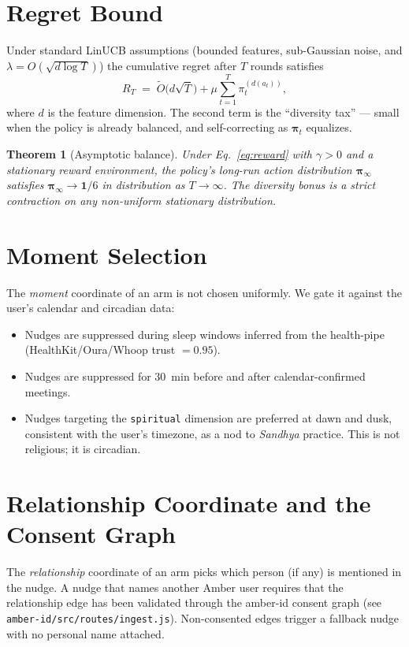 \documentclass[11pt]{article}
\newtheorem{theorem}{Theorem}
\begin{document}
\section{Regret Bound}

Under standard LinUCB assumptions (bounded features, sub-Gaussian
noise, and $\lambda = O(\sqrt{d\log T})$) the cumulative regret after
$T$ rounds satisfies
\[
R_T \;=\; \tilde O\!\bigl(d\sqrt{T}\bigr) + \mu \sum_{t=1}^{T} \pi_t^{(d(a_t))},
\]
where $d$ is the feature dimension. The second term is the
``diversity tax'' --- small when the policy is already balanced, and
self-correcting as $\bm{\pi}_t$ equalizes.

\begin{theorem}[Asymptotic balance]
Under Eq.~\ref{eq:reward} with $\gamma > 0$ and a stationary reward
environment, the policy's long-run action distribution $\bm{\pi}_\infty$
satisfies $\bm{\pi}_\infty \to \bm{1}/6$ in distribution as
$T \to \infty$. The diversity bonus is a strict contraction on any
non-uniform stationary distribution.
\end{theorem}

\section{Moment Selection}

The \emph{moment} coordinate of an arm is not chosen uniformly. We
gate it against the user's calendar and circadian data:
\begin{itemize}
\item Nudges are suppressed during sleep windows inferred from the
      health-pipe (HealthKit/Oura/Whoop trust $=0.95$).
\item Nudges are suppressed for $30$~min before and after
      calendar-confirmed meetings.
\item Nudges targeting the \texttt{spiritual} dimension are preferred
      at dawn and dusk, consistent with the user's timezone, as a
      nod to \emph{Sandhya} practice. This is not religious; it is
      circadian.
\end{itemize}

\section{Relationship Coordinate and the Consent Graph}

The \emph{relationship} coordinate of an arm picks which person (if
any) is mentioned in the nudge. A nudge that names another Amber user
requires that the relationship edge has been validated through the
amber-id consent graph (see \texttt{amber-id/src/routes/ingest.js}).
Non-consented edges trigger a fallback nudge with no personal name
attached.
\end{document}
